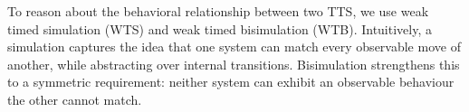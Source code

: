 




To reason about the behavioral relationship between two TTS, we 
use weak timed simulation (WTS) and weak timed bisimulation (WTB). Intuitively, 
a simulation captures the idea that one system can match every 
observable move of another, while abstracting over internal 
transitions. Bisimulation strengthens 
this to a symmetric requirement: neither system can exhibit an 
observable behaviour the other cannot match.

